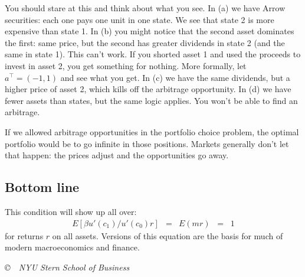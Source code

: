 \documentclass[11pt]{article}
\begin{document}
You should stare at this and think about what you see.
In (a) we have Arrow securities:  each one pays one unit
in one state.
We see that state 2 is more expensive than state 1.
In (b) you might notice that the second asset dominates the first:
same price, but the second has greater dividends in state 2
(and the same in state 1).
This can't work.  If you shorted asset 1 and used the proceeds to invest
in asset 2, you get something for nothing.
More  formally, let $a^\top = (-1,1)$ and see what you get.
In (c) we have the same dividends, but a higher price of asset 2,
which kills off the arbitrage opportunity.
In (d) we have fewer assets than states, but the same logic applies.
You won't be able to find an arbitrage.

If we allowed arbitrage opportunities in the portfolio choice
problem, the optimal portfolio would be to go infinite in
those positions.
Markets generally don't let that happen:
the prices adjust and the opportunities go away.


\subsection*{Bottom line}

This condition will show up all over:
\begin{eqnarray*}
    E \left[ \beta u'(c_1) / u'(c_0) r \right] &=&
        E \left( m r \right) \;\;=\;\;  1
\end{eqnarray*}
for returns $r$ on all assets.
Versions of this equation are the basis for
much of modern macroeconomics and finance.

\vfill \centerline{\it \copyright \ \number\year \
NYU Stern School of Business}
\end{document}

